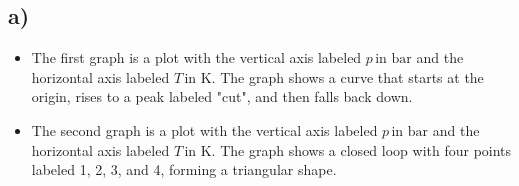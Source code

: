

\subsection*{a)}

\begin{itemize}
    \item The first graph is a plot with the vertical axis labeled \( p \, \text{in bar} \) and the horizontal axis labeled \( T \, \text{in K} \). The graph shows a curve that starts at the origin, rises to a peak labeled "cut", and then falls back down.
    \item The second graph is a plot with the vertical axis labeled \( p \, \text{in bar} \) and the horizontal axis labeled \( T \, \text{in K} \). The graph shows a closed loop with four points labeled 1, 2, 3, and 4, forming a triangular shape.
\end{itemize}